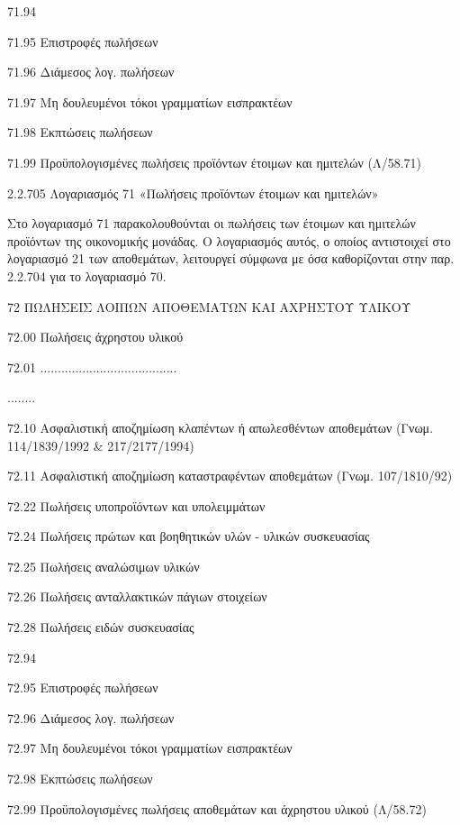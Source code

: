\documentclass[A4,10pt,greek]{book}
\begin{document}
        71.94

        71.95    Επιστροφές πωλήσεων

        71.96    Διάμεσος λογ. πωλήσεων

        71.97    Μη δουλευμένοι τόκοι γραμματίων εισπρακτέων

        71.98    Εκπτώσεις πωλήσεων

        71.99    Προϋπολογισμένες πωλήσεις προϊόντων έτοιμων και
                     ημιτελών (Λ/58.71)

2.2.705 Λογαριασμός 71 «Πωλήσεις προϊόντων έτοιμων και ημιτελών»

Στο λογαριασμό 71 παρακολουθούνται οι πωλήσεις των έτοιμων και ημιτελών προϊόντων της οικονομικής μονάδας. Ο λογαριασμός αυτός, ο οποίος αντιστοιχεί στο λογαριασμό 21 των αποθεμάτων, λειτουργεί σύμφωνα με όσα καθορίζονται στην παρ. 2.2.704 για το λογαριασμό 70.

 72    ΠΩΛΗΣΕΙΣ ΛΟΙΠΩΝ ΑΠΟΘΕΜΑΤΩΝ ΚΑΙ ΑΧΡΗΣΤΟΥ ΥΛΙΚΟΥ

        72.00    Πωλήσεις άχρηστου υλικού 

        72.01    .......................................

        ........

        72.10    Ασφαλιστική αποζημίωση κλαπέντων ή απωλεσθέντων αποθεμάτων
                     (Γνωμ. 114/1839/1992 \& 217/2177/1994)

        72.11    Ασφαλιστική αποζημίωση καταστραφέντων αποθεμάτων
                     (Γνωμ. 107/1810/92)

        72.22    Πωλήσεις υποπροϊόντων και υπολειμμάτων 

        72.24    Πωλήσεις πρώτων και βοηθητικών υλών - υλικών συσκευασίας 

        72.25    Πωλήσεις αναλώσιμων υλικών 

        72.26    Πωλήσεις ανταλλακτικών πάγιων στοιχείων 

        72.28    Πωλήσεις ειδών συσκευασίας 

        72.94

        72.95    Επιστροφές πωλήσεων

        72.96    Διάμεσος λογ. πωλήσεων

        72.97    Μη δουλευμένοι τόκοι γραμματίων εισπρακτέων

        72.98    Εκπτώσεις πωλήσεων

        72.99    Προϋπολογισμένες πωλήσεις αποθεμάτων και άχρηστου υλικού
                     (Λ/58.72)
\end{document}
